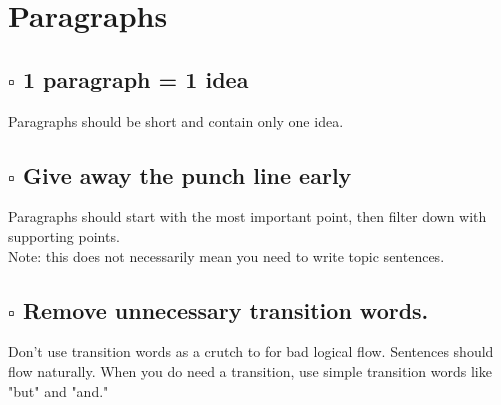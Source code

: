 \documentclass{article}
\begin{document}
\section*{Paragraphs}
\begin{adjustwidth}{1cm}{}

    \subsection*{$\square$ 1 paragraph = 1 idea}

    \begin{adjustwidth}{1cm}{}
        Paragraphs should be short and contain only one idea. 
    \end{adjustwidth}

    \subsection*{$\square$ Give away the punch line early}

    \begin{adjustwidth}{1cm}{}
        Paragraphs should start with the most important point, then filter down with supporting points.
        \\
        
        \noindent
        Note: this does not necessarily mean you need to write topic sentences.  
    \end{adjustwidth}
    
    \subsection*{$\square$ Remove unnecessary transition words.}

    \begin{adjustwidth}{1cm}{}
        Don't use transition words as a crutch to for bad logical flow. Sentences should flow naturally. When you do need a transition, use simple transition words like "but" and "and."
    \end{adjustwidth}


 
\end{adjustwidth}
\end{document}
